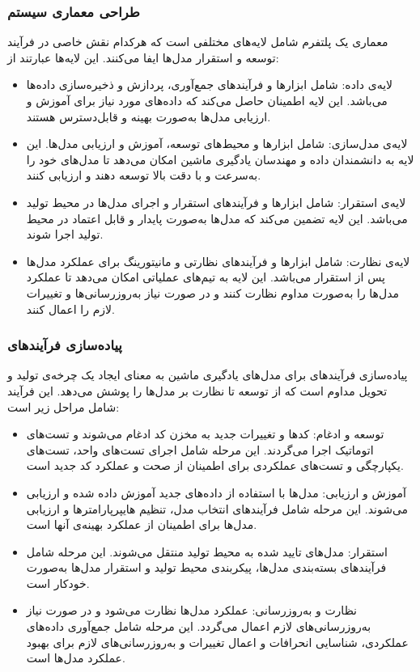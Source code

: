 \subsubsection{طراحی معماری سیستم}

معماری یک پلتفرم  شامل لایه‌های مختلفی است که هرکدام نقش خاصی در فرآیند توسعه و استقرار مدل‌ها ایفا می‌کنند. این لایه‌ها عبارتند از:

\begin{itemize}
	\item
	لایه‌ی داده: شامل ابزارها و فرآیندهای جمع‌آوری، پردازش و ذخیره‌سازی داده‌ها می‌باشد. این لایه اطمینان حاصل می‌کند که داده‌های مورد نیاز برای آموزش و ارزیابی مدل‌ها به‌صورت بهینه و قابل‌دسترس هستند.
	\item 
	لایه‌ی مدل‌سازی: شامل ابزارها و محیط‌های توسعه، آموزش و ارزیابی مدل‌ها. این لایه به دانشمندان داده و مهندسان یادگیری ماشین امکان می‌دهد تا مدل‌های خود را به‌سرعت و با دقت بالا توسعه دهند و ارزیابی کنند.
	\item
	لایه‌ی استقرار: شامل ابزارها و فرآیندهای استقرار و اجرای مدل‌ها در محیط تولید می‌باشد. این لایه تضمین می‌کند که مدل‌ها به‌صورت پایدار و قابل اعتماد در محیط تولید اجرا شوند.
	\item
	لایه‌ی نظارت: شامل ابزارها و فرآیندهای نظارتی و مانیتورینگ برای عملکرد مدل‌ها پس از استقرار می‌باشد. این لایه به تیم‌های عملیاتی امکان می‌دهد تا عملکرد مدل‌ها را به‌صورت مداوم نظارت کنند و در صورت نیاز به‌روزرسانی‌ها و تغییرات لازم را اعمال کنند.
\end{itemize}

\subsubsection{پیاده‌سازی فرآیندهای }

پیاده‌سازی فرآیندهای  برای مدل‌های یادگیری ماشین به معنای ایجاد یک چرخه‌ی تولید و تحویل مداوم است که از توسعه تا نظارت بر مدل‌ها را پوشش می‌دهد. این فرآیند شامل مراحل زیر است:

\begin{itemize}
	\item 
	توسعه و ادغام: کدها و تغییرات جدید به مخزن کد ادغام می‌شوند و تست‌های اتوماتیک اجرا می‌گردند. این مرحله شامل اجرای تست‌های واحد، تست‌های یکپارچگی و تست‌های عملکردی برای اطمینان از صحت و عملکرد کد جدید است.
	\item
	آموزش و ارزیابی: مدل‌ها با استفاده از داده‌های جدید آموزش داده شده و ارزیابی می‌شوند. این مرحله شامل فرآیندهای انتخاب مدل، تنظیم هایپرپارامترها و ارزیابی مدل‌ها برای اطمینان از عملکرد بهینه‌ی آنها است.
	\item
	استقرار: مدل‌های تایید شده به محیط تولید منتقل می‌شوند. این مرحله شامل فرآیندهای بسته‌بندی مدل‌ها، پیکربندی محیط تولید و استقرار مدل‌ها به‌صورت خودکار است.
	\item
	نظارت و به‌روزرسانی: عملکرد مدل‌ها نظارت می‌شود و در صورت نیاز به‌روزرسانی‌های لازم اعمال می‌گردد. این مرحله شامل جمع‌آوری داده‌های عملکردی، شناسایی انحرافات و اعمال تغییرات و به‌روزرسانی‌های لازم برای بهبود عملکرد مدل‌ها است.
\end{itemize}


